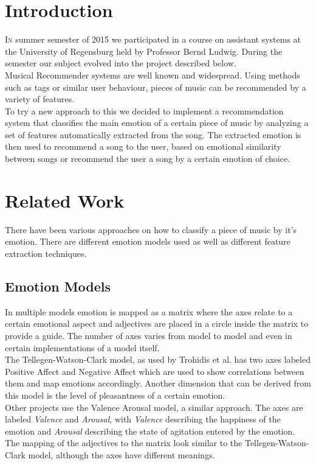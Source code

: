 \begin{multicols}{2} %

\section{Introduction}
\lettrine[nindent=0em,lines=3]{I}n summer semester of 2015 we participated in a course on assistant systems at the University of Regensburg held by Professor Bernd Ludwig. During the semester our subject evolved into the project described below.\\
Musical Recommender systems are well known and widespread. Using methods such as tags or similar user behaviour, pieces of music can be recommended by a variety of features.\\
To try a new approach to this we decided to implement a recommendation system that classifies the main emotion of a certain piece of music by analyzing a set of features automatically extracted from the song. The extracted emotion is then used to recommend a song to the user, based on emotional similarity between songs or recommend the user a song by a certain emotion of choice.

\section{Related Work}
There have been various approaches on how to classify a piece of music by it’s emotion. There are different emotion models used as well as different feature extraction techniques.

\subsection{Emotion Models}
In multiple models emotion is mapped as a matrix where the axes relate to a certain emotional aspect and adjectives are placed in a circle inside the matrix to provide a guide. The number of axes varies from model to model and even in certain implementations of a model itself.\\
The Tellegen-Watson-Clark model, as used by Trohidis et al. has two axes labeled Positive Affect and Negative Affect which are used to show correlations between them and map emotions accordingly. Another dimension that can be derived from this model is the level of pleasantness of a certain emotion.\\

Other projects use the Valence Arousal model, a similar approach. The axes are labeled \textit{Valence} and \textit{Arousal}, with \textit{Valence} describing the happiness of the emotion and \textit{Arousal} describing the state of agitation entered by the emotion. The mapping of the adjectives to the matrix look similar to the Tellegen-Watson-Clark model, although the axes have different meanings.


\end{multicols}
